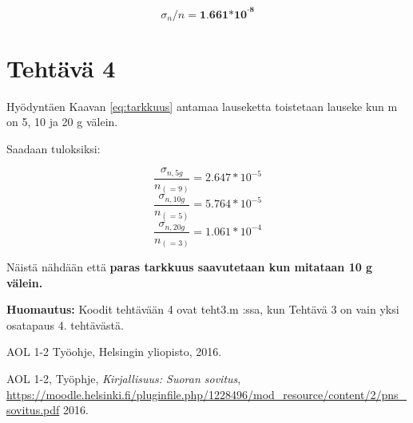 \documentclass[a4paper, 12pt]{article}
\begin{document}
\begin{equation}
\sigma_n /n = \textbf{1.661*10}^{\textbf{-8}}
\label{eq:tarkkuus}
\end{equation}

\section*{Tehtävä 4}

Hyödyntäen Kaavan \ref{eq:tarkkuus} antamaa lauseketta toistetaan lauseke kun m on 5, 10 ja 20 g välein.

Saadaan tuloksiksi:

\begin{equation}
\frac{\sigma_{n,5g}}{ n_{(=9)}}  = 2.647* 10^{-5}
\end{equation}
\begin{equation}
\frac{\sigma_{n,10g}}{ n_{(=5)}}  = 5.764* 10^{-5}
\end{equation}
\begin{equation}
\frac{\sigma_{n,20g}}{ n_{(=3)}}  = 1.061* 10^{-4}
% 
% 
% 
% 
% 
% 
% 
% 
% 
% 
% 
% 
% 
% 
% 
% 
\end{equation}

Näistä nähdään että \textbf{paras tarkkuus saavutetaan kun mitataan 10 g välein.}

\textbf{Huomautus:} Koodit tehtävään 4 ovat teht3.m :ssa, kun Tehtävä 3 on vain yksi osatapaus 4. tehtävästä. 


\begin{thebibliography}{1}

  AOL 1-2 Työohje,
  Helsingin yliopisto,
  2016.

  AOL 1-2, Työphje,
  \emph{Kirjallisuus: Suoran sovitus},
  \url{https://moodle.helsinki.fi/pluginfile.php/1228496/mod_resource/content/2/pns_sovitus.pdf}
  2016.



\end{thebibliography}
\end{document}
